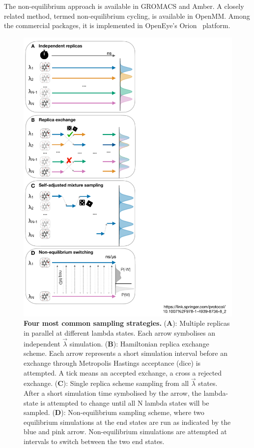 \documentclass[9pt,bestpractices,pubversion]{livecoms}
\begin{document}
The non-equilibrium approach is available in GROMACS and Amber. A closely related method, termed non-equilibrium cycling, is available in OpenMM. Among the commercial packages, it is implemented in OpenEye's Orion{\textregistered}~\cite{sorensen2024orion} platform.

\begin{figure}
    \includegraphics[width=0.88\columnwidth]{figures/fig8_sampl_scheme/Figure.pdf}
    \caption{\textbf{Four most common sampling strategies.} (\textbf{A}): Multiple replicas in parallel at different lambda states. Each arrow symbolises an independent $\vec{\lambda}$ simulation. (\textbf{B}): Hamiltonian replica exchange scheme. Each arrow represents a short simulation interval before an exchange through Metropolis Hastings acceptance (dice) is attempted. A tick means an accepted exchange, a cross a rejected exchange. (\textbf{C}): Single replica scheme sampling from all $\vec{\lambda}$ states. After a short simulation time symbolised by the arrow, the lambda-state is attempted to change until all N lambda states will be sampled. (\textbf{D}): Non-equilibrium sampling scheme, where two equilibrium simulations at the end states are run as indicated by the blue and pink arrow. Non-equilibrium simulations are attempted at intervals to switch between the two end states.}
    \label{fig:fig_sampling_scheme}
\end{figure} 
\end{document}
